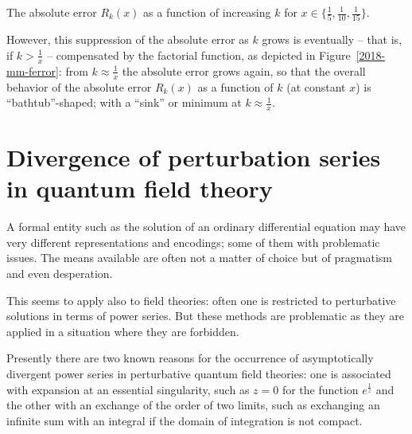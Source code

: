 \begin{marginfigure}
\begin{center}
\end{center}
\caption{The absolute error $R_k(x)$ as a function of increasing $k$
for $x\in \{\frac{1}{5},\frac{1}{10},\frac{1}{15}\}$.}
  \label{2018-mm-ferror}
\end{marginfigure}
However, this suppression of the absolute error as $k$ grows is eventually
-- that is, if $k > \frac{1}{x}$ -- compensated by the factorial function,
as depicted in Figure~\ref{2018-mm-ferror}: from $k \approx \frac{1}{x}$ the absolute error grows again,
so that the overall behavior of the absolute error $R_k(x)$  as a function of $k$ (at constant $x$)
is ``bathtub''-shaped; with a ``sink'' or minimum at $k \approx \frac{1}{x}$.


\section{Divergence of perturbation series in quantum field theory}

A formal entity such as the solution of an ordinary differential equation may have very
different representations and encodings; some of them with problematic issues.
The means available are often not a matter of choice but of pragmatism and even desperation.\cite{Boyd99thedevil}

This seems to apply also to field theories:
often one is restricted to perturbative solutions in terms of power series.
But these methods are problematic as they are applied in a situation where they are forbidden.

Presently there are two known reasons for the occurrence of asymptotically divergent power series in perturbative quantum field theories:
one is associated with expansion at an essential singularity,  such as $z=0$ for the function $e^\frac{1}{z}$
and the other with an exchange of the order of two limits,
such as exchanging an infinite sum with an integral if the domain of integration is not compact.


